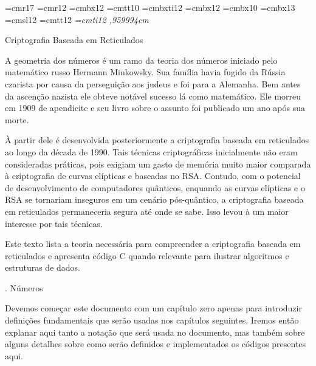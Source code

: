 \font\seventeen=cmr17
\font\twelve=cmr12
\font\fonteautor=cmbx12
\font\fonteemail=cmtt10
\font\twelvenegit=cmbxti12
\font\twelvebold=cmbx12
\font\tenbold=cmbx10
\font\trezebold=cmbx13
\font\twelveit=cmsl12
\font\monodoze=cmtt12
\font\it=cmti12
,959994cm %
\parskip=6pt

\def\titulo#1{{\noindent\sixteen\hbox to\hsize{\hfill#1\hfill}}}
\def\autor#1{{\noindent\fonteautor\hbox to\hsize{\hfill#1\hfill}}}
\def\email#1{{\noindent\fonteemail\hbox to\hsize{\hfill#1\hfill}}}
\def\negrito#1{{\tenbold#1}}
\def\italico#1{{\twelveit#1}}
\def\monoespaco#1{{\monodoze#1}}
\def\iniciocodigo{\lineskip=0pt\parskip=0pt}
\def\fimcodigo{\twelve\parskip=0pt plus 1pt\lineskip=1pt}


\def\vec#1#2{{\tenbold #1}$_{#2}$}
\def\mat#1{{\tenbold #1}}

{\seventeen \hfil Criptografia Baseada em Reticulados}

\vskip1cm

A geometria dos números é um ramo da teoria dos números iniciado pelo
matemático russo Hermann Minkowsky. Sua família havia fugido da Rússia
czarista por causa da perseguição aos judeus e foi para a
Alemanha. Bem antes da ascenção nazista ele obteve notável sucesso lá
como matemático. Ele morreu em 1909 de apendicite e seu livro sobre o
assunto foi publicado um ano após sua morte.

À partir dele é desenvolvida posteriormente a criptografia baseada em
reticulados ao longo da década de 1990. Tais técnicas criptográficas
inicialmente não eram consideradas práticas, pois exigiam um gasto de
memória muito maior comparada à criptografia de curvas elípticas e
baseadas no RSA. Contudo, com o potencial de desenvolvimento de
computadores quânticos, enquando as curvas elípticas e o RSA se
tornariam inseguros em um cenário pós-quântico, a criptografia baseada
em reticulados permaneceria segura até onde se sabe. Isso levou à um
maior interesse por tais técnicas.

Este texto lista a teoria necessária para compreender a criptografia
baseada em reticulados e apresenta código C quando relevante para
ilustrar algoritmos e estruturas de dados.

\vskip0.5cm

{\twelvebold {}. Números}

Devemos começar este documento com um capítulo zero apenas para
introduzir definições fundamentais que serão usadas nos capítulos
seguintes. Iremos então explanar aqui tanto a notação que será usada
no documento, mas também sobre alguns detalhes sobre como serão
definidos e implementados os códigos presentes aqui.

